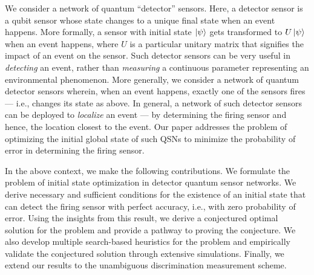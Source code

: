 We consider a network of quantum ``detector'' sensors. Here,
a detector sensor is a qubit sensor whose state changes to a unique final state when an event happens. 
More formally, a sensor with initial state $\ket{\psi}$ gets transformed to $U\ket{\psi}$ when an event happens, where $U$ is a particular unitary matrix that signifies the impact of an event on the sensor.  Such detector sensors can be very useful in {\em detecting} an event, rather than {\em measuring} a continuous parameter representing an environmental phenomenon. 
More generally, we 
consider a network of quantum detector sensors wherein, when an event happens, exactly one of the sensors fires--- i.e., changes its state as above.
In general, a network of such detector sensors can be deployed to {\em localize} an event --- by determining the firing sensor and hence, the location closest to the event.
Our paper addresses the problem of optimizing the initial global state of such QSNs
to minimize the probability of error in determining the firing sensor.

In the above context, we make the following contributions. 
We formulate the problem of initial state optimization in detector quantum sensor networks. We derive necessary and sufficient conditions for the existence of an initial state that can detect the firing sensor with perfect accuracy, i.e., with zero probability of error.
Using the insights from this result, we derive a conjectured optimal solution for the problem and provide a pathway to proving the conjecture. 
We also develop multiple search-based heuristics for the problem and  
empirically validate the conjectured solution 
through extensive simulations. Finally, we extend our results to the unambiguous discrimination measurement scheme.


